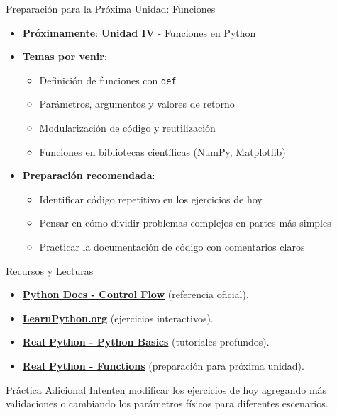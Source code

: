 \documentclass[10pt]{beamer}
\begin{document}
\begin{frame}{Preparación para la Próxima Unidad: Funciones}
  \begin{itemize}
    \item \textbf{Próximamente}: \textbf{Unidad IV} - Funciones en Python
    \item \textbf{Temas por venir}:
      \begin{itemize}
        \item Definición de funciones con \texttt{def}
        \item Parámetros, argumentos y valores de retorno
        \item Modularización de código y reutilización
        \item Funciones en bibliotecas científicas (NumPy, Matplotlib)
      \end{itemize}
    \item \textbf{Preparación recomendada}:
      \begin{itemize}
        \item Identificar código repetitivo en los ejercicios de hoy
        \item Pensar en cómo dividir problemas complejos en partes más simples
        \item Practicar la documentación de código con comentarios claros
      \end{itemize}
  \end{itemize}
\end{frame}

\begin{frame}{Recursos y Lecturas}
  \begin{itemize}
    \item \href{https://docs.python.org/3/tutorial/controlflow.html}{\textbf{Python Docs - Control Flow}} (referencia oficial).
    \item \href{https://www.learnpython.org/}{\textbf{LearnPython.org}} (ejercicios interactivos).
    \item \href{https://realpython.com/python-basics/}{\textbf{Real Python - Python Basics}} (tutoriales profundos).
    \item \href{https://realpython.com/python-functions/}{\textbf{Real Python - Functions}} (preparación para próxima unidad).
  \end{itemize}
  
  \begin{block}{Práctica Adicional}
    Intenten modificar los ejercicios de hoy agregando más validaciones o cambiando los parámetros físicos para diferentes escenarios.
  \end{block}
\end{frame}
\end{document}
